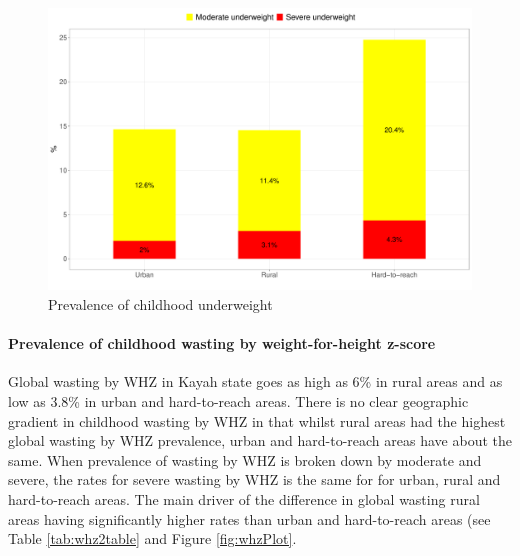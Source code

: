 \documentclass[12pt,a4paper]{article}
\let\oldparagraph\paragraph
\renewcommand{\paragraph}[1]{\oldparagraph{#1}\mbox{}}
\begin{document}
\begin{figure}[H]

{\centering \includegraphics{kayahReport_files/figure-latex/underweightPlot-1} 

}

\caption{Prevalence of childhood underweight}\label{fig:underweightPlot}
\end{figure}

\hypertarget{whz}{%
\paragraph{Prevalence of childhood wasting by weight-for-height z-score}\label{whz}}

Global wasting by WHZ in Kayah state goes as high as 6\% in rural areas and as low as 3.8\% in urban and hard-to-reach areas. There is no clear geographic gradient in childhood wasting by WHZ in that whilst rural areas had the highest global wasting by WHZ prevalence, urban and hard-to-reach areas have about the same. When prevalence of wasting by WHZ is broken down by moderate and severe, the rates for severe wasting by WHZ is the same for for urban, rural and hard-to-reach areas. The main driver of the difference in global wasting rural areas having significantly higher rates than urban and hard-to-reach areas (see Table \ref{tab:whz2table} and Figure \ref{fig:whzPlot}.
\end{document}
